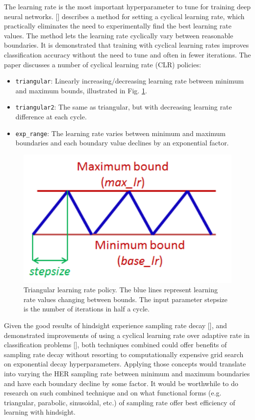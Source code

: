 \documentclass[conference]{IEEEtran}
\begin{document}
The learning rate is the most important hyperparameter to tune for training deep neural networks. [\cite{smith2017cyclical}] describes a method for setting a cyclical learning rate, which practically eliminates the need to experimentally find the best learning rate values. The method lets the learning rate cyclically vary between reasonable boundaries. It is demonstrated that training with cyclical learning rates improves classification accuracy without the need to tune and often in fewer iterations. The paper discusses a number of cyclical learning rate (CLR) policies:
\begin{itemize}
    \item \texttt{triangular}: Linearly increasing/decreasing learning rate between minimum and maximum bounds, illustrated in Fig. \ref{fig:research_clr}.
    \item \texttt{triangular2}: The same as triangular, but with decreasing learning rate difference at each cycle.
    \item \texttt{exp\_range}: The learning rate varies between minimum and maximum boundaries and each boundary value declines by an exponential factor.
\end{itemize}
\begin{figure}[ht]
\centering
\includegraphics[width=0.7\columnwidth]{img/CLR.png}
\caption{Triangular learning rate policy. The blue lines represent learning rate values changing between bounds. The input parameter stepsize is the number of iterations in half a cycle.}
\label{fig:research_clr}
\end{figure}

Given the good results of hindsight experience sampling rate decay [\cite{vecchietti2020sampling}], and demonstrated improvements of using a cyclical learning rate over adaptive rate in classification problems [\cite{smith2017cyclical}], both techniques combined could offer benefits of sampling rate decay without resorting to computationally expensive grid search on exponential decay hyperparameters. Applying those concepts would translate into varying the HER sampling rate between minimum and maximum boundaries and have each boundary decline by some factor. It would be worthwhile to do research on such combined technique and on what functional forms (e.g. triangular, parabolic, sinusoidal, etc.) of sampling rate offer best efficiency of learning with hindsight.
\end{document}

